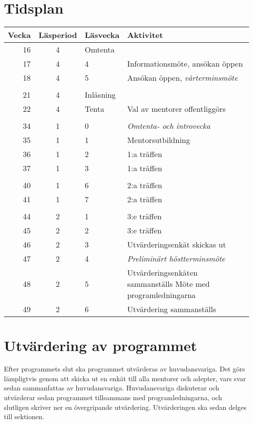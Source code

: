 \documentclass[10pt]{article}
\begin{document}
    \section{Tidsplan}
    \begin{tabularx}{\textwidth}{rclX}
        \textbf{Vecka} & \textbf{Läsperiod} & \textbf{Läsvecka} & \textbf{Aktivitet} \\
        \hline
        16 & 4 & Omtenta & \\
        17 & 4 & 4 & Informationsmöte, ansökan öppen \\
        18 & 4 & 5 & Ansökan öppen, \emph{vårterminsmöte} \\
        \\
        21 & 4 & Inläsning & \\
        22 & 4 & Tenta & Val av mentorer offentliggörs \\
        \\
        34 & 1 & 0 & \emph{Omtenta- och introvecka} \\
        35 & 1 & 1 & Mentorsutbildning \\
        36 & 1 & 2 & 1:a träffen \\
        37 & 1 & 3 & 1:a träffen \\
        \\
        40 & 1 & 6 & 2:a träffen \\
        41 & 1 & 7 & 2:a träffen \\
        \\
        44 & 2 & 1 & 3:e träffen \\
        45 & 2 & 2 & 3:e träffen \\
        46 & 2 & 3 & Utvärderingsenkät skickas ut \\
        47 & 2 & 4 & \emph{Preliminärt höstterminsmöte} \\
        48 & 2 & 5 & Utvärderingsenkäten sammanställs \newline
                     Möte med programledningarna \\
        49 & 2 & 6 & Utvärdering sammanställs \\
    \end{tabularx}

    \newpage

    \section{Utvärdering av programmet}
    Efter programmets slut ska programmet utvärderas av huvudansvariga.
    Det görs lämpligtvis genom att skicka ut en enkät till alla mentorer och adepter, vars svar sedan sammanfattas av huvudansvariga.
    Huvudansvariga diskuterar och utvärderar sedan programmet tillsammans med programledningarna, och slutligen skriver ner en övergripande utvärdering.
    Utvärderingen ska sedan delges till sektionen.
\end{document}
